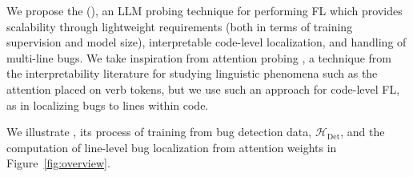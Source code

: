 We propose the \ourmethodlong{} (\ourmethod{}),
an LLM probing technique for performing FL which provides scalability through lightweight requirements (both in terms of training supervision and model size), interpretable code-level localization, and handling of multi-line bugs.
We take inspiration from attention probing \citep{tenney2018you, niu2022does}, a technique from the interpretability literature for studying linguistic phenomena such as the attention placed on verb tokens, but we use such an approach for code-level FL, as in localizing bugs to lines within code.


We illustrate \ourmethod{}, its process of training from bug detection data, $\mathcal{H}_\text{Det}$, and the computation of line-level bug localization from attention weights in Figure~\ref{fig:overview}.

